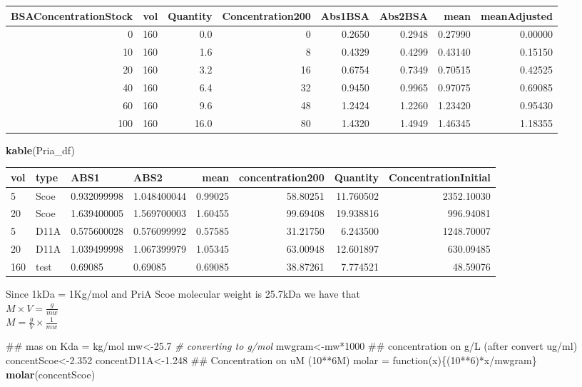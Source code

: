 \documentclass[]{article}
\newenvironment{Shaded}{\begin{snugshade}}{\end{snugshade}}
\newcommand{\KeywordTok}[1]{\textcolor[rgb]{0.13,0.29,0.53}{\textbf{{#1}}}}
\newcommand{\DecValTok}[1]{\textcolor[rgb]{0.00,0.00,0.81}{{#1}}}
\newcommand{\FloatTok}[1]{\textcolor[rgb]{0.00,0.00,0.81}{{#1}}}
\newcommand{\StringTok}[1]{\textcolor[rgb]{0.31,0.60,0.02}{{#1}}}
\newcommand{\CommentTok}[1]{\textcolor[rgb]{0.56,0.35,0.01}{\textit{{#1}}}}
\newcommand{\NormalTok}[1]{{#1}}
\begin{document}
\begin{longtable}[]{@{}rrrrrrrr@{}}
\toprule
BSAConcentrationStock & vol & Quantity & Concentration200 & Abs1BSA &
Abs2BSA & mean & meanAdjusted\tabularnewline
\midrule
\endhead
0 & 160 & 0.0 & 0 & 0.2650 & 0.2948 & 0.27990 & 0.00000\tabularnewline
10 & 160 & 1.6 & 8 & 0.4329 & 0.4299 & 0.43140 & 0.15150\tabularnewline
20 & 160 & 3.2 & 16 & 0.6754 & 0.7349 & 0.70515 & 0.42525\tabularnewline
40 & 160 & 6.4 & 32 & 0.9450 & 0.9965 & 0.97075 & 0.69085\tabularnewline
60 & 160 & 9.6 & 48 & 1.2424 & 1.2260 & 1.23420 & 0.95430\tabularnewline
100 & 160 & 16.0 & 80 & 1.4320 & 1.4949 & 1.46345 &
1.18355\tabularnewline
\bottomrule
\end{longtable}

\begin{Shaded}
\begin{Highlighting}[]
\KeywordTok{kable}\NormalTok{(Pria_df)}
\end{Highlighting}
\end{Shaded}

\begin{longtable}[]{@{}llllrrrr@{}}
\toprule
vol & type & ABS1 & ABS2 & mean & concentration200 & Quantity &
ConcentrationInitial\tabularnewline
\midrule
\endhead
5 & Scoe & 0.932099998 & 1.048400044 & 0.99025 & 58.80251 & 11.760502 &
2352.10030\tabularnewline
20 & Scoe & 1.639400005 & 1.569700003 & 1.60455 & 99.69408 & 19.938816 &
996.94081\tabularnewline
5 & D11A & 0.575600028 & 0.576099992 & 0.57585 & 31.21750 & 6.243500 &
1248.70007\tabularnewline
20 & D11A & 1.039499998 & 1.067399979 & 1.05345 & 63.00948 & 12.601897 &
630.09485\tabularnewline
160 & test & 0.69085 & 0.69085 & 0.69085 & 38.87261 & 7.774521 &
48.59076\tabularnewline
\bottomrule
\end{longtable}

Since 1kDa = 1Kg/mol and PriA Scoe molecular weight is 25.7kDa we have
that\\
\(M\times V = \frac{g}{mw}\)\\
\(M=\frac{g}{V}\times\frac{1}{mw}\)

\begin{Shaded}
\begin{Highlighting}[]
\NormalTok{## mas on Kda = kg/mol  }
\NormalTok{mw<-}\FloatTok{25.7} 
\CommentTok{# converting to g/mol  }
\NormalTok{mwgram<-mw*}\DecValTok{1000}  
\NormalTok{## concentration on g/L (after convert ug/ml)}
\NormalTok{concentScoe<-}\FloatTok{2.352}
\NormalTok{concentD11A<-}\FloatTok{1.248}
\NormalTok{## Concentration on uM (10**6M)}
\NormalTok{molar =}\StringTok{ }\NormalTok{function(x)\{(}\DecValTok{10}\NormalTok{**}\DecValTok{6}\NormalTok{)*x/mwgram\}}
\KeywordTok{molar}\NormalTok{(concentScoe)}
\end{Highlighting}
\end{Shaded}
\end{document}
